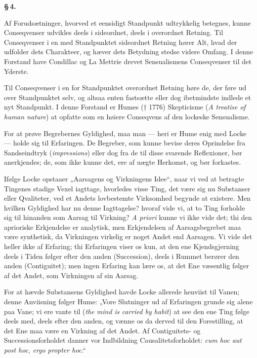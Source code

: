 \documentclass[12pt]{book}
\newcommand{\opage}[1]{\marginnote{\footnotesize\textit{[#1]}}}
\begin{document}
\begin{center}{\bfseries \S\,4.}\end{center}

Af Forudsætninger, hvorved et eensidigt Standpunkt udtrykkelig betegnes, kunne
Conseqvenser udvikles deels i sideordnet, deels i overordnet Retning. Til
Conseqvenser i en med Standpunktet sideordnet Retning hører Alt, hvad der udfolder
dets Charakteer, og hæver dets Betydning
\opage{15} stedse videre Omfang. I denne Forstand have Condillac og La Mettrie drevet
Sensualismens Conseqvenser til det Yderste.

Til Conseqvenser i en for Standpunktet overordnet Retning høre de, der føre ud over
Standpunktet selv, og altsaa enten fastsætte eller dog ibetmindste indlede et nyt
Standpunkt. I denne Forstand er Humes († 1776) Skepticisme (\textit{A treatise of
human nature}) at opfatte som en høiere Conseqvens af den lockeske Sensualisme.

For at prøve Begrebernes Gyldighed, maa man --- heri er Hume enig med Locke ---
holde sig til Erfaringen. De Begreber, som kunne bevise deres Oprindelse fra
Sandseindtryk (\textit{impressions}) eller dog fra de til disse svarende
Reflexioner, bør anerkjendes; de, som ikke kunne det, ere af uægte Herkomst, og bør
forkastes.

Ifølge Locke opstaaer „Aarsagens og Virkningens Idee“, naar vi ved at betragte
Tingenes stadige Vexel iagttage, hvorledes visse Ting, det være sig nu Substanser
eller Qvaliteter, ved et Andets lovbestemte Virksomhed begynde at existere. Men
hvilken Gyldighed har nu denne Iagttagelse? hvoraf vide vi, at to Ting forholde sig
til hinanden som Aarsag til Virkning? \textit{A priori} kunne vi ikke vide det; thi
den aprioriske Erkjendelse er analytisk, men Erkjendelsen af Aarsagsbegrebet maa
være synthetisk, da Virkningen virkelig er noget Andet end Aarsagen. Vi vide det
heller ikke af Erfaring; thi Erfaringen viser os kun, at den ene Kjendsgjerning
deels i Tiden følger efter den anden (Succession),
deels i Rummet berører den anden (Contiguitet); men ingen Erfaring kan lære os, at
det Ene væsentlig følger af det Andet, som Virkningen af sin Aarsag.

For at hævde Substansens Gyldighed havde Locke allerede henviist til Vanen; denne
Anviisning følger Hume: „Vore Slutninger ud af Erfaringen grunde sig alene paa Vane;
vi ere vante til (\textit{the mind is carried by habit}) at see den ene Ting følge
deels med, deels efter den anden, og vænne os da derved til den Forestilling, at det
Ene
\opage{16} %
maa være en Virkning af det Andet. Af Contiguitets- og Successionsforholdet danner
vor Indbildning Causalitetsforholdet: \textit{cum hoc aut post hoc, ergo propter
hoc}.“
\end{document}
